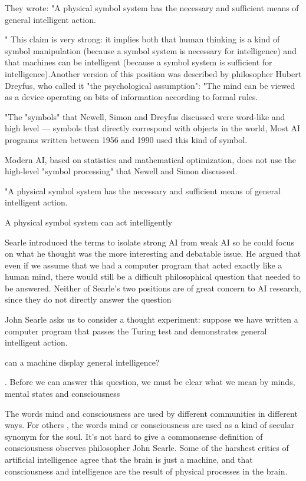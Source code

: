 \documentclass{article}
\begin{document}
They wrote: "A physical symbol system has the necessary and sufficient means of general intelligent action.

" This claim is very strong: it implies both that human thinking is a kind of symbol manipulation (because a symbol system is necessary for intelligence) and that machines can be intelligent (because a symbol system is sufficient for intelligence).Another version of this position was described by philosopher Hubert Dreyfus, who called it "the psychological assumption": "The mind can be viewed as a device operating on bits of information according to formal rules.

"The "symbols" that Newell, Simon and Dreyfus discussed were word-like and high level — symbols that directly correspond with objects in the world, 
Most AI programs written between 1956 and 1990 used this kind of symbol.


Modern AI, based on statistics and mathematical optimization, does not use the high-level "symbol processing" that Newell and Simon discussed.

"A physical symbol system has the necessary and sufficient means of general intelligent action.

A physical symbol system can act intelligently

Searle introduced the terms to isolate strong AI from weak AI so he could focus on what he thought was the more interesting and debatable issue. He argued that even if we assume that we had a computer program that acted exactly like a human mind, there would still be a difficult philosophical question that needed to be answered. Neither of Searle's two positions are of great concern to AI research, since they do not directly answer the question 

John Searle asks us to consider a thought experiment: suppose we have written a computer program that passes the Turing test and demonstrates general intelligent action.

can a machine display general intelligence?

 . Before we can answer this question, we must be clear what we mean by minds, mental states and consciousness

The words mind and consciousness are used by different communities in different ways. For others , the words mind or consciousness are used as a kind of secular synonym for the soul. It's not hard to give a commonsense definition of consciousness observes philosopher John Searle. Some of the harshest critics of artificial intelligence agree that the brain is just a machine, and that consciousness and intelligence are the result of physical processes in the brain.
\end{document}
